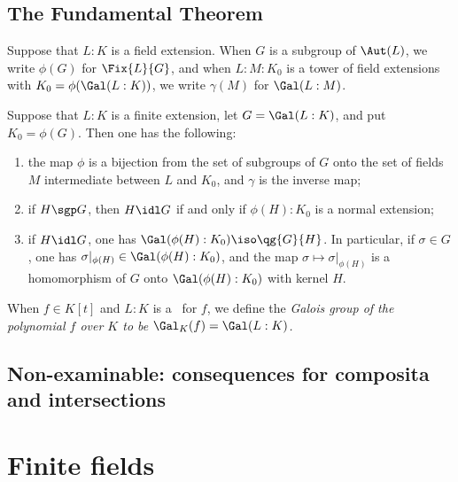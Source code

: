 \documentclass[a4paper]{article}
\begin{document}
\subsection{The Fundamental Theorem}
\begin{tdefinition}
  Suppose that \( L:K \) is a field extension.
  When \( G \) is a subgroup of \( \Aut(L) \), we write \( \phi(G) \) for \( \Fix{L}{G} \), and when \( L:M:K_0 \) is a tower of field extensions with \( K_0=\phi(\Gal(L:K)) \), we write \( \gamma(M) \) for \( \Gal(L:M) \).
\end{tdefinition}

\begin{ttheorem}
  Suppose that \( L:K \) is a finite extension, let \( G=\Gal(L:K) \), and put \( K_0=\phi(G) \).
  Then one has the following: \begin{enumerate}[label=(\alph*)]
    \item the map \( \phi \) is a bijection from the set of subgroups of \( G \) onto the set of fields \( M \) intermediate between \( L \) and \( K_0 \), and \( \gamma \) is the inverse map;
    \item if \( H \sgp G \), then \( H\idl G \) if and only if \( \phi(H):K_0 \) is a normal extension;
    \item if \( H\idl G \), one has \( \Gal(\phi(H):K_0) \iso \qg{G}{H} \).
      In particular, if \( \sigma\in G \), one has \( \sigma|_{\phi(H)} \in \Gal(\phi(H):K_0) \), and the map \( \sigma\mapsto\sigma|_{\phi(H)} \) is a homomorphism of \( G \) onto \( \Gal(\phi(H):K_0) \) with kernel \( H \).
  \end{enumerate}
\end{ttheorem}

\begin{tdefinition}
  When \( f\in K[t] \) and \( L:K \) is a \sfe~for \( f \), we define the \it{Galois group of the polynomial \( f \) over \( K \)} to be \( \Gal_K(f) = \Gal(L:K) \).
\end{tdefinition}

\subsection{Non-examinable: consequences for composita and intersections}

\section{Finite fields}
\end{document}
